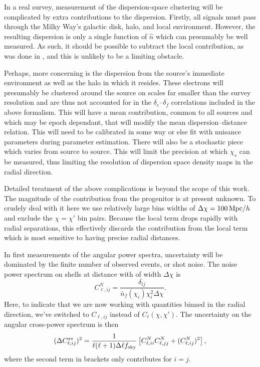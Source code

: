 \documentclass[twocolumn,prl,floatfix]{revtex4-1}
\begin{document}
In a real survey, measurement of the dispersion-space clustering
will be complicated by extra contributions to the dispersion.
Firstly, all signals
must pass through the Milky Way's galactic disk, halo, and local environment.
However, the resulting dispersion is only a
single function of $\hat n$ which can presumably be well
measured. As such, it should be
possible to subtract the local
contribution, as was done in
\citet{2014arXiv1412.4829D}, and this is unlikely to be a limiting obstacle.

Perhaps, more concerning is the dispersion from the source's immediate environment
as well as the halo in which it resides. These electrons will presumably be
clustered around the source on scales far smaller than the survey
resolution and are thus not accounted for in the
$\delta_e$--$\delta_f$
correlations included in the above formalism.  This will have a mean
contribution, common to all sources and which may be epoch dependant, that will
modify the mean dispersion--distance relation. This will need to be calibrated in some
way or else fit with nuisance parameters during parameter estimation.  There
will also be a stochastic piece which varies from source to source.  This will
limit the precision at which $\chi_s$ can be measured, thus limiting the
resolution of dispersion space density maps in the radial direction.

Detailed treatment of the above complications is beyond the scope of this
work. The magnitude of the contribution from the progenitor is at present
unknown. To crudely deal with it here we use relatively large
bins widths of $\Delta\chi = 100\,{\rm Mpc}/h$
and exclude the $\chi = \chi'$ bin pairs.
Because the local term drops rapidly with radial separations, this effectively 
discards the contribution from the local term which is most sensitive to having
precise radial distances.

In first measurements of the angular power spectra, uncertainty will be
dominated by the finite number of observed events, or shot noise.
The noise power spectrum on shells at distance with of width
$\Delta \chi$ is
\begin{equation}
    C^N_{\ell, ij} = \frac{\delta_{ij}}{\bar n_f(\chi_i)\chi_i^2\Delta\chi}.
\end{equation}
Here, to indicate that we are now working with quantities binned in the radial
direction, we've switched to $C_{\ell,ij}$ instead of
$C_\ell(\chi, \chi')$. The uncertainty on the angular
cross-power spectrum is then
\begin{align}
    (\Delta{C^{ss}_{\ell,ij}})^2 = 
    {\frac{1}{\ell(\ell + 1)\Delta \ell f_{\rm sky}}}
        \left[C^N_{\ell,ii} C^N_{\ell,jj} +  (C^N_{\ell,ij})^2\right],
\end{align}
where the second term in brackets only contributes for $i = j$.
\end{document}
